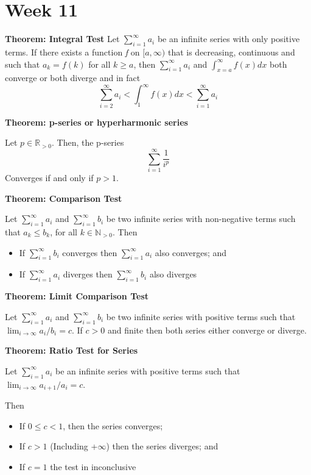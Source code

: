 \documentclass{article}
\newcommand*{\N}{\mathbb{N}}
\newcommand*{\R}{\mathbb{R}}
\begin{document}
\section{Week 11}
\textbf{Theorem: Integral Test}
Let \(\sum^{\infty}_{i=1}a_i\) be an infinite series with only positive terms. If there exists a function \textit{f} on \([a,\infty)\) that is decreasing, continuous and such that \(a_k = f(k)\) for all \(k \geq a\), then \(\sum^{\infty}_{i=1}a_i\) and \(\int^{\infty}_{x=a}f(x)dx\) both converge or both diverge and in fact 
\begin{equation}
    \sum^{\infty}_{i=2}a_i < \int^{\infty}_{1}f(x)dx < \sum^{\infty}_{i=1}a_i
\end{equation}

\textbf{Theorem: p-series or hyperharmonic series}

Let \(p \in \R_{>0}\). Then, the p-series
\begin{equation}
    \sum^{\infty}_{i=1}\frac{1}{i^p}
\end{equation}
Converges if and only if \(p > 1\).

\vspace{\baselineskip}
\textbf{Theorem: Comparison Test}

Let \(\sum^{\infty}_{i=1}a_i\) and \(\sum^{\infty}_{i=1}b_i\) be two infinite series with non-negative terms such that \(a_k \leq b_k\), for all \(k \in \N_{>0}\). Then
\begin{itemize}
    \item If \(\sum^{\infty}_{i=1}b_i\) converges then \(\sum^{\infty}_{i=1}a_i\) also converges; and 
    \item If \(\sum^{\infty}_{i=1}a_i\) diverges then \(\sum^{\infty}_{i=1}b_i\) also diverges
\end{itemize}

\vspace{\baselineskip}
\textbf{Theorem: Limit Comparison Test}

Let \(\sum^{\infty}_{i=1}a_i\) and \(\sum^{\infty}_{i=1}b_i\) be two infinite series with positive terms such that \(\lim_{i\to\infty}a_i/b_i = c\). If \(c > 0\) and finite then both series either converge or diverge.

\vspace{\baselineskip}
\textbf{Theorem: Ratio Test for Series}

Let \(\sum^{\infty}_{i=1}a_i\) be an infinite series with positive terms such that \(\lim_{i\to\infty}a_{i+1}/a_i = c\).

Then
\begin{itemize}
    \item If \(0 \leq c < 1\), then the series converges;
    \item If \(c > 1\) (Including +\(\infty\)) then the series diverges; and
    \item If \(c = 1\) the test in inconclusive
\end{itemize}
\end{document}
